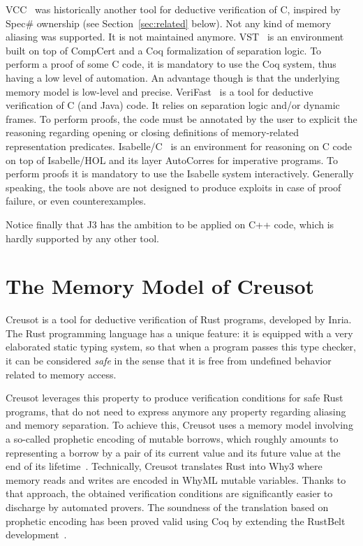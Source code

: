 \documentclass[a4paper,11pt]{article}
\begin{document}
VCC~\cite{dahlweid09icse} was historically another tool for deductive
verification of C, inspired by Spec\# ownership (see Section~\ref{sec:related}
below). Not any kind of memory aliasing was supported. It is not maintained
anymore.
%
VST~\cite{appel11esop} is an environment built on top of CompCert and a Coq
formalization of separation logic. To perform a proof of some C code, it is
mandatory to use the Coq system, thus having a low level of automation. An
advantage though is that the underlying memory model is low-level and precise.
%
\mbox{VeriFast}~\cite{jacobs11nfm} is a tool for deductive verification of C (and Java)
code. It relies on separation logic and/or dynamic frames. To perform proofs,
the code must be annotated by the user to explicit the reasoning regarding
opening or closing definitions of memory-related representation predicates.
%
Isabelle/C~\cite{tuong19fide} is an environment for reasoning on C code on top
of Isabelle/HOL and its layer AutoCorres for imperative programs. To perform
proofs it is mandatory to use the Isabelle system interactively.
%
Generally speaking, the tools above are not designed to produce exploits in case of
proof failure, or even counterexamples.

Notice finally that J3 has the ambition to be applied on C++ code, which is
hardly supported by any other tool.

\section{The Memory Model of Creusot}
\label{sec:creusot}



Creusot is a tool for deductive verification of Rust programs, developed by
Inria. The Rust programming language has a unique feature: it is equipped with a
very elaborated static typing system, so that when a program passes this type
checker, it can be considered \emph{safe} in the sense that it is free from
undefined behavior related to memory access.

Creusot leverages this property to produce verification conditions for safe Rust
programs, that do not need to express anymore any property regarding aliasing
and memory separation. To achieve this, Creusot uses a memory model involving a
so-called prophetic encoding of mutable borrows, which roughly amounts to
representing a borrow by a pair of its current value and its future value at the
end of its lifetime~\cite{denis22icfem,denis23phd}. Technically, Creusot
translates Rust into Why3 where memory reads and writes are encoded in WhyML
mutable variables. Thanks to that approach, the obtained verification
conditions are significantly easier to discharge by automated provers. The
soundness of the translation based on prophetic encoding has been proved valid
using Coq by extending the RustBelt development~\cite{matsushita22pldi}.
\end{document}

